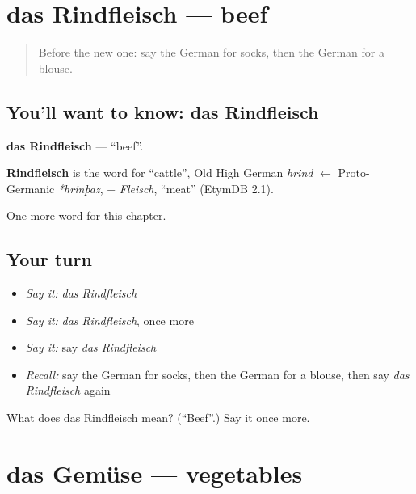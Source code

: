 \section[das Rindfleisch]{das Rindfleisch — beef}

\label{lesson:GE-C120-rindfleisch}



\begin{quote}
Before the new one: say the German for socks, then the German for a blouse.
\end{quote}

\subsection*{You'll want to know: das Rindfleisch}
\textbf{das Rindfleisch} — \textquotedblleft{}beef\textquotedblright{}.

\begin{cousinweb}
\textbf{Rindfleisch} is the word for \textquotedblleft{}cattle\textquotedblright{}, Old High German \emph{hrind} $\leftarrow$ Proto-Germanic \emph{*hrinþaz}, + \emph{Fleisch}, \textquotedblleft{}meat\textquotedblright{} (EtymDB 2.1).
\end{cousinweb}

\begin{grammarlens}[title={What you've built}]
One more word for this chapter.
\end{grammarlens}

\subsection*{Your turn}
\begin{itemize}
\raggedright
  \item \emph{Say it:} \emph{das Rindfleisch}
  \item \emph{Say it:} \emph{das Rindfleisch}, once more
  \item \emph{Say it:} say \emph{das Rindfleisch}
  \item \emph{Recall:} say the German for socks, then the German for a blouse, then say \emph{das Rindfleisch} again
\end{itemize}

\begin{tcolorbox}[breakable,colback=teal!4,colframe=teal!35!black,title={Before you move on}]
What does das Rindfleisch mean? (\textquotedblleft{}Beef\textquotedblright{}.) Say it once more.
\end{tcolorbox}
\section[das Gemüse]{das Gemüse — vegetables}

